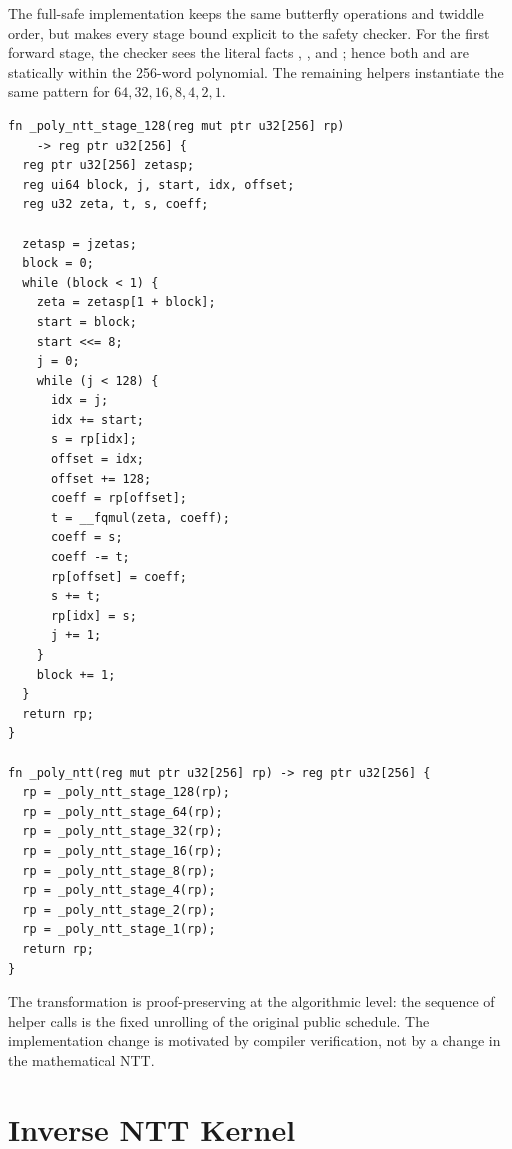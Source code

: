 The full-safe implementation keeps the same butterfly operations and twiddle
order, but makes every stage bound explicit to the \jasmin{} safety checker.
For the first forward stage, the checker sees the literal facts
, , and ; hence both
 and  are statically within the 256-word
polynomial.  The remaining helpers instantiate the same pattern for
\(64,32,16,8,4,2,1\).

\begin{lstlisting}[language=Jasmin,
  caption={Current full-safe forward NTT stage shape in \texttt{poly.jinc}},
  label={lst:ntt_jasmin_safe_stage}]
fn _poly_ntt_stage_128(reg mut ptr u32[256] rp)
    -> reg ptr u32[256] {
  reg ptr u32[256] zetasp;
  reg ui64 block, j, start, idx, offset;
  reg u32 zeta, t, s, coeff;

  zetasp = jzetas;
  block = 0;
  while (block < 1) {
    zeta = zetasp[1 + block];
    start = block;
    start <<= 8;
    j = 0;
    while (j < 128) {
      idx = j;
      idx += start;
      s = rp[idx];
      offset = idx;
      offset += 128;
      coeff = rp[offset];
      t = __fqmul(zeta, coeff);
      coeff = s;
      coeff -= t;
      rp[offset] = coeff;
      s += t;
      rp[idx] = s;
      j += 1;
    }
    block += 1;
  }
  return rp;
}

fn _poly_ntt(reg mut ptr u32[256] rp) -> reg ptr u32[256] {
  rp = _poly_ntt_stage_128(rp);
  rp = _poly_ntt_stage_64(rp);
  rp = _poly_ntt_stage_32(rp);
  rp = _poly_ntt_stage_16(rp);
  rp = _poly_ntt_stage_8(rp);
  rp = _poly_ntt_stage_4(rp);
  rp = _poly_ntt_stage_2(rp);
  rp = _poly_ntt_stage_1(rp);
  return rp;
}
\end{lstlisting}

The transformation is proof-preserving at the algorithmic level: the sequence
of helper calls is the fixed unrolling of the original public 
schedule.  The implementation change is motivated by compiler verification,
not by a change in the mathematical NTT.

\section{Inverse NTT Kernel}

